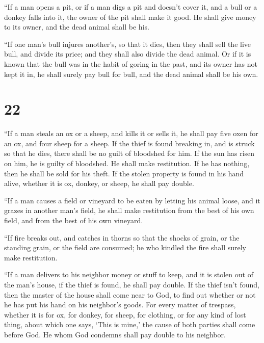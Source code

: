  ``If a man opens a pit, or if a man digs a pit and
doesn't cover it, and a bull or a donkey falls into it, 
the owner of the pit shall make it good. He shall give money to its
owner, and the dead animal shall be his.

 ``If one man's bull injures another's, so that it dies,
then they shall sell the live bull, and divide its price; and they shall
also divide the dead animal.  Or if it is known that the
bull was in the habit of goring in the past, and its owner has not kept
it in, he shall surely pay bull for bull, and the dead animal shall be
his own.

\hypertarget{section-21}{%
\section{22}\label{section-21}}

 ``If a man steals an ox or a sheep, and kills it or sells
it, he shall pay five oxen for an ox, and four sheep for a sheep.
 If the thief is found breaking in, and is struck so that
he dies, there shall be no guilt of bloodshed for him.  If
the sun has risen on him, he is guilty of bloodshed. He shall make
restitution. If he has nothing, then he shall be sold for his theft.
 If the stolen property is found in his hand alive,
whether it is ox, donkey, or sheep, he shall pay double.

 ``If a man causes a field or vineyard to be eaten by
letting his animal loose, and it grazes in another man's field, he shall
make restitution from the best of his own field, and from the best of
his own vineyard.

 ``If fire breaks out, and catches in thorns so that the
shocks of grain, or the standing grain, or the field are consumed; he
who kindled the fire shall surely make restitution.

 ``If a man delivers to his neighbor money or stuff to
keep, and it is stolen out of the man's house, if the thief is found, he
shall pay double.  If the thief isn't found, then the
master of the house shall come near to God, to find out whether or not
he has put his hand on his neighbor's goods.  For every
matter of trespass, whether it is for ox, for donkey, for sheep, for
clothing, or for any kind of lost thing, about which one says, `This is
mine,' the cause of both parties shall come before God. He whom God
condemns shall pay double to his neighbor.

